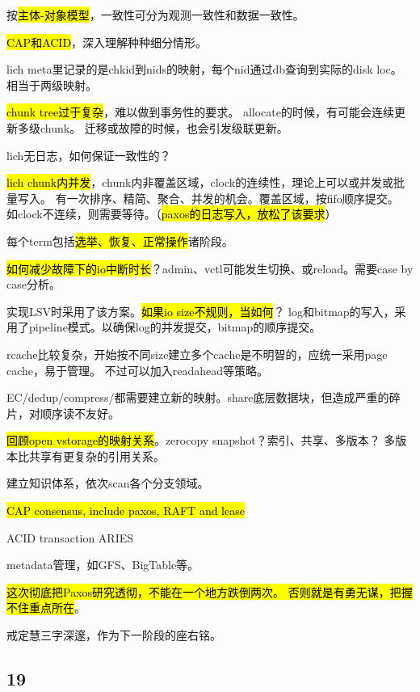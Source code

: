 按\hl{主体-对象模型}，一致性可分为观测一致性和数据一致性。

\hl{CAP和ACID}，深入理解种种细分情形。

\hrulefill

lich meta里记录的是chkid到nids的映射，每个nid通过db查询到实际的disk loc。
相当于两级映射。

\hl{chunk tree过于复杂}，难以做到事务性的要求。
allocate的时候，有可能会连续更新多级chunk。
迁移或故障的时候，也会引发级联更新。

lich无日志，如何保证一致性的？

\hl{lich chunk内并发}，chunk内非覆盖区域，clock的连续性，理论上可以或并发或批量写入。
有一次排序、精简、聚合、并发的机会。覆盖区域，按fifo顺序提交。
如clock不连续，则需要等待。（\hl{paxos的日志写入，放松了该要求}）

每个term包括\hl{选举、恢复、正常操作}诸阶段。

\hl{如何减少故障下的io中断时长}？admin、vctl可能发生切换、或reload。需要case by case分析。

实现LSV时采用了该方案。\hl{如果io size不规则，当如何}？
log和bitmap的写入，采用了pipeline模式。以确保log的并发提交，bitmap的顺序提交。

rcache比较复杂，开始按不同size建立多个cache是不明智的，应统一采用page cache，易于管理。
不过可以加入readahead等策略。

EC/dedup/compress/都需要建立新的映射。share底层数据块，但造成严重的碎片，对顺序读不友好。

\hl{回顾open vstorage的映射关系}。zerocopy snapshot？索引、共享、多版本？
多版本比共享有更复杂的引用关系。

\hrulefill

建立知识体系，依次scan各个分支领域。
\begin{enumbox}
\item \hl{CAP consensus, include paxos, RAFT and lease}
\item ACID transaction ARIES
\item metadata管理，如GFS、BigTable等。
\end{enumbox}

\hl{这次彻底把Paxos研究透彻，不能在一个地方跌倒两次。
否则就是有勇无谋，把握不住重点所在}。

戒定慧三字深邃，作为下一阶段的座右铭。

\subsection{19}

